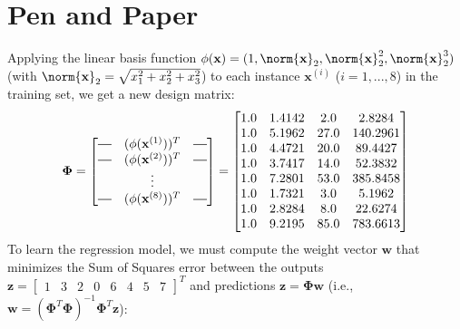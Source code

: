 \documentclass{exam}
\newcommand*{\horzbar}{\rule[.5ex]{2.5ex}{0.5pt}}
\begin{document}
    \section{Pen and Paper}
    \begin{questions}
        \item Applying the linear basis function $\phi(\textbf{x}) = (1, \norm{\textbf{x}}_2, \norm{\textbf{x}}_2^2, \norm{\textbf{x}}_2^3)$ (with $\norm{\textbf{x}}_2 = \sqrt{x_1^2 + x_2^2 + x_3^2}$) to each instance $\textbf{x}^{(i)}$ ($i = 1, ..., 8$) in the training set, we get a new design matrix:
        \begin{equation*}
            \boldsymbol{\Phi} = 
            \begin{bmatrix}
                \horzbar & (\phi(\textbf{x}^{(1)}))^T & \horzbar \\
                \horzbar & (\phi(\textbf{x}^{(2)}))^T & \horzbar \\
                         & \vdots    &                     \\
                \horzbar & (\phi(\textbf{x}^{(8)}))^T & \horzbar \\
            \end{bmatrix} =
            \begin{bmatrix}
                1.0 & 1.4142 & 2.0 & 2.8284 \\
                1.0 & 5.1962 & 27.0 & 140.2961 \\
                1.0 & 4.4721 & 20.0 & 89.4427 \\
                1.0 & 3.7417 & 14.0 & 52.3832 \\
                1.0 & 7.2801 & 53.0 & 385.8458 \\
                1.0 & 1.7321 & 3.0 & 5.1962 \\
                1.0 & 2.8284 & 8.0 & 22.6274 \\
                1.0 & 9.2195 & 85.0 & 783.6613 \\
            \end{bmatrix}
        \end{equation*}
        To learn the regression model, we must compute the weight vector $\textbf{w}$ that minimizes the Sum of Squares error between the outputs $\textbf{z} = 
            \begin{bmatrix}
                1 & 3 & 2 & 0 & 6 & 4 & 5 & 7
            \end{bmatrix}^T$ and predictions $\textbf{\^{z}} = \boldsymbol{\Phi} \textbf{w}$ (i.e., $\textbf{w} = (\boldsymbol{\Phi}^T\boldsymbol{\Phi})^{-1}\boldsymbol{\Phi}^T\textbf{z}$):

\end{questions}
\end{document}
